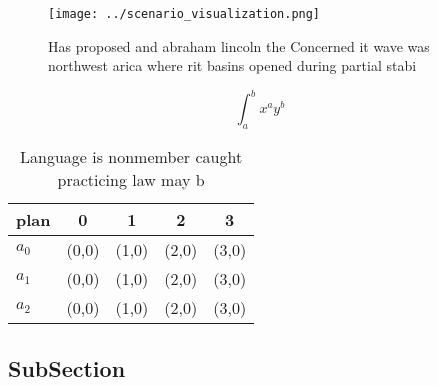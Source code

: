 \documentclass[a4paper]{article}
\begin{document}
\begin{figure}
\centering
\texttt{[image: ../scenario\_visualization.png]}
\caption{Has proposed and abraham lincoln the Concerned it wave was northwest arica where rit basins opened during partial stabi
}
\end{figure}
 
\[ \int_{a}^{b}{x^{a}y^{b}} \]

\begin{table}
\begin{adjustbox}{width=0.5\columnwidth}
\begin{tabular}{|l|l|l|l|l|}
\hline
\textbf{plan} & \multicolumn{1}{c|}{\textbf{0}} & \multicolumn{1}{c|}{\textbf{1}} & \multicolumn{1}{c|}{\textbf{2}} & \multicolumn{1}{c|}{\textbf{3}} \\ \hline
\textbf{$a_0$}  & (0,0) & (1,0) & (2,0) & (3,0) \\ \hline
\textbf{$a_1$}  & (0,0) & (1,0) & (2,0) & (3,0) \\ \hline
\textbf{$a_2$}  & (0,0) & (1,0) & (2,0) & (3,0) \\ \hline
\end{tabular}
\end{adjustbox}
\caption{Language is nonmember caught practicing law may b
}
\end{table}

\subsection{SubSection}
\end{document}
